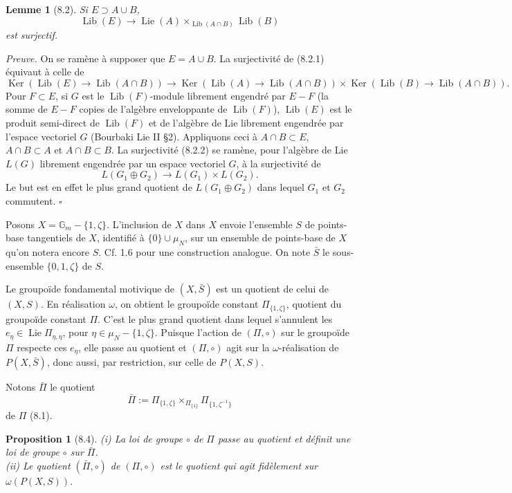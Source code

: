\documentclass[10pt,a4paper]{article}
\newcommand{\Gm}{\mathbb G_m}
\newcommand{\Ker}{\operatorname{Ker}}
\newcommand{\Lie}{\operatorname{Lie}}
\newcommand{\Lib}{\operatorname{Lib}}
\theoremstyle{deligne}
\newtheorem*{proposition*}{Proposition}
\newtheorem*{lemma*}{Lemme}
\newenvironment{proofdel}{\textit{Preuve.}}{\hfill$\square$}
\newcommand{\heading}[1]{\vspace{0.65em}\noindent{\bfseries #1}\quad}
\begin{document}
\begin{lemma*}[8.2]
Si \(E\supset A\cup B\),
\[
\tag{8.2.1}
\Lib(E)\longrightarrow \Lie(A)\times_{\Lib(A\cap B)}\Lib(B)
\]
est surjectif.
\end{lemma*}

\begin{proofdel}
On se ramène à supposer que \(E=A\cup B\). La surjectivité de (8.2.1) équivaut à celle de
\[
\tag{8.2.2}
\Ker(\Lib(E)\to\Lib(A\cap B))
\longrightarrow
\Ker(\Lib(A)\to\Lib(A\cap B))\times
\Ker(\Lib(B)\to\Lib(A\cap B)).
\]
Pour \(F\subset E\), si \(G\) est le \(\Lib(F)\)-module librement engendré par \(E-F\) (la somme de \(E-F\) copies de l'algèbre enveloppante de \(\Lib(F)\)), \(\Lib(E)\) est le produit semi-direct de \(\Lib(F)\) et de l'algèbre de Lie librement engendrée par l'espace vectoriel \(G\) (Bourbaki Lie II \S2). Appliquons ceci à \(A\cap B\subset E\), \(A\cap B\subset A\) et \(A\cap B\subset B\). La surjectivité (8.2.2) se ramène, pour l'algèbre de Lie \(L(G)\) librement engendrée par un espace vectoriel \(G\), à la surjectivité de
\[
L(G_1\oplus G_2)\longrightarrow L(G_1)\times L(G_2).
\]
Le but est en effet le plus grand quotient de \(L(G_1\oplus G_2)\) dans lequel \(G_1\) et \(G_2\) commutent.
\end{proofdel}

\heading{8.3.} Posons \(X=\Gm-\{1,\zeta\}\). L'inclusion de \(X\) dans \(X\) envoie l'ensemble \(S\) de points-base tangentiels de \(X\), identifié à \(\{0\}\cup\mu_N\), sur un ensemble de points-base de \(X\) qu'on notera encore \(S\). Cf. 1.6 pour une construction analogue. On note \(\bar S\) le sous-ensemble \(\{0,1,\zeta\}\) de \(S\).

Le groupoïde fondamental motivique de \((X,\bar S)\) est un quotient de celui de \((X,S)\). En réalisation \(\omega\), on obtient le groupoïde constant \(\Pi_{\{1,\zeta\}}\), quotient du groupoïde constant \(\Pi\). C'est le plus grand quotient dans lequel s'annulent les \(e_\eta\in\Lie\Pi_{\eta,\eta}\), pour \(\eta\in\mu_N-\{1,\zeta\}\). Puisque l'action de \((\Pi,\circ)\) sur le groupoïde \(\Pi\) respecte ces \(e_\eta\), elle passe au quotient et \((\Pi,\circ)\) agit sur la \(\omega\)-réalisation de \(P(X,\bar S)\), donc aussi, par restriction, sur celle de \(P(X,S)\).

Notons \(\bar\Pi\) le quotient
\[
\bar\Pi:=\Pi_{\{1,\zeta\}}\times_{\Pi_{\{1\}}}\Pi_{\{1,\zeta^{-1}\}}
\]
de \(\Pi\) (8.1).

\begin{proposition*}[8.4]
(i) La loi de groupe \(\circ\) de \(\Pi\) passe au quotient et définit une loi de groupe \(\circ\) sur \(\bar\Pi\).\\
(ii) Le quotient \((\bar\Pi,\circ)\) de \((\Pi,\circ)\) est le quotient qui agit fidèlement sur \(\omega(P(X,S))\).
\end{proposition*}
\end{document}
